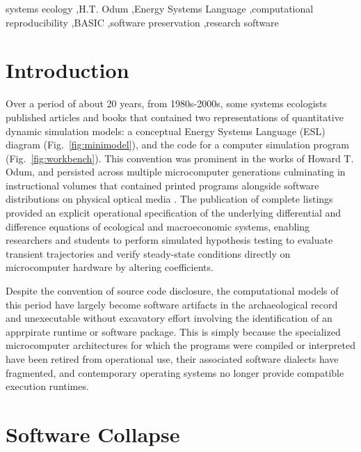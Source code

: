 \documentclass[3p,times,authoryear,twocolumn]{elsarticle}
\begin{document}
\begin{frontmatter}
\begin{keyword}
systems ecology \sep H.T. Odum \sep Energy Systems Language \sep computational reproducibility \sep BASIC \sep software preservation \sep research software
\end{keyword}

\end{frontmatter}

\section{Introduction}
\label{sec:intro}

Over a period of about 20 years, from 1980s-2000s, some systems ecologists published articles and books that contained two representations of quantitative dynamic simulation models: a conceptual Energy Systems Language (ESL) diagram (Fig.~\ref{fig:minimodel}), and the code for a computer simulation program (Fig.~\ref{fig:workbench}). This  convention was prominent in the works of Howard T. Odum, and persisted across multiple microcomputer generations culminating in instructional volumes that contained printed programs alongside software distributions on physical optical media \citep{odum1983,odumMinimodels,odumOdum2000}. The publication of complete listings provided an explicit operational specification of the underlying differential and difference equations of ecological and macroeconomic systems, enabling researchers and students to perform simulated hypothesis testing to evaluate transient trajectories and verify steady-state conditions directly on microcomputer hardware by altering coefficients.

Despite the convention of source code disclosure, the computational models of this period have largely become software artifacts in the archaeological record and unexecutable without excavatory effort involving the identification of an apprpirate runtime or software package. This is simply because the specialized microcomputer architectures for which the programs were compiled or interpreted have been retired from operational use, their associated software dialects have fragmented, and contemporary operating systems no longer provide compatible execution runtimes. 

\section{Software Collapse}
\label{sec:collapse}
\end{document}
